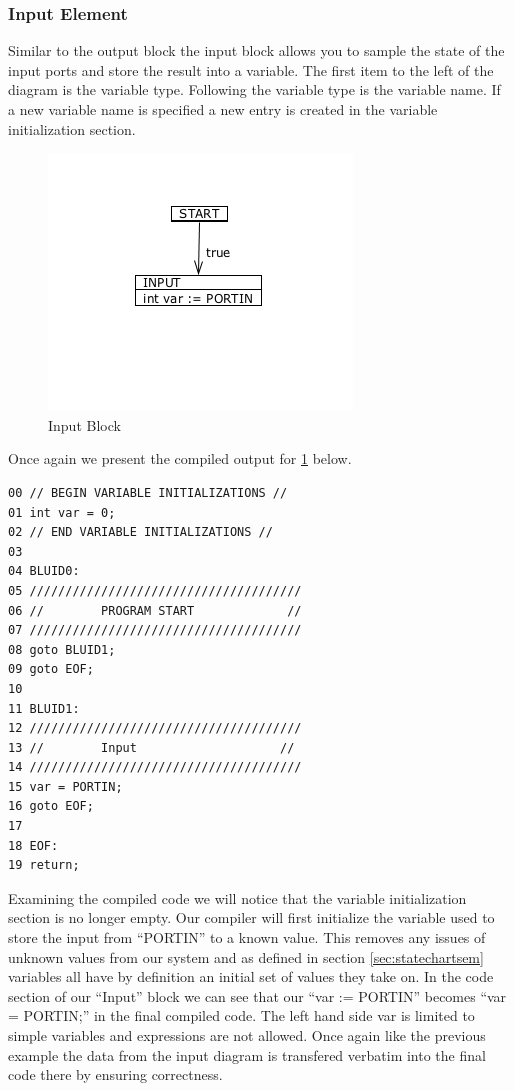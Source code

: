 \subsubsection{Input Element}

Similar to the output block the input block allows you to sample the state of the input ports and store the result into a variable. The first item to the left of the diagram is the variable type. Following the variable type is the variable name. If a new variable name is specified a new entry is created in the variable initialization section. 


\begin{figure}[htb]
	\centering
	\includegraphics[width=\imgmedphoto]{./images/correctness_ex_input.png}
	\caption{Input Block}
	\label{fig:correctness_ex_input}
\end{figure}

Once again we present the compiled output for \ref{fig:correctness_ex_input} below.

\begin{minipage}{\textwidth}
\begin{lstlisting}[frame=single]
00 // BEGIN VARIABLE INITIALIZATIONS //
01 int var = 0;
02 // END VARIABLE INITIALIZATIONS //
03 
04 BLUID0:
05 //////////////////////////////////////
06 //        PROGRAM START             //
07 //////////////////////////////////////
08 goto BLUID1;
09 goto EOF;
10
11 BLUID1:
12 //////////////////////////////////////
13 //        Input                    //
14 //////////////////////////////////////
15 var = PORTIN;
16 goto EOF;
17
18 EOF:
19 return;
\end{lstlisting}
\end{minipage}

Examining the compiled code we will notice that the variable initialization section is no longer empty. Our compiler will first initialize the variable used to store the input from ``PORTIN'' to a known value. This removes any issues of unknown values from our system and as defined in section \ref{sec:statechartsem} variables all have by definition an initial set of values they take on. In the code section of our ``Input'' block we can see that our ``var := PORTIN'' becomes ``var = PORTIN;'' in the final compiled code. The left hand side var is limited to simple variables and expressions are not allowed. Once again like the previous example the data from the input diagram is transfered verbatim into the final code there by ensuring correctness.


